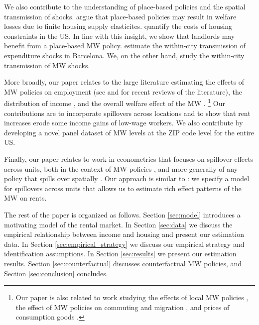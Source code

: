 We also contribute to the understanding of place-based policies and the spatial 
transmission of shocks.
\textcite{KlineMoretti2014} argue that place-based policies may result in 
welfare losses due to finite housing supply elasticites.
\textcite{HsiehMoretti2019} quantify the costs of housing constraints in the US.
In line with this insight, we show that landlords may benefit from a place-based 
MW policy.
\textcite{AllenEtAl2020} estimate the within-city transmission of expenditure 
shocks in Barcelona.
We, on the other hand, study the within-city transmission of MW shocks.

More broadly, our paper relates to the large literature estimating the effects
of MW policies on employment
(see \cite{Dube2019} and \cite{NeumarkShirley2021} for recent reviews of the 
literature), 
the distribution of income \parencite[e.g.,][]{Lee1999, AutorEtAl2016, 
	Dube2019Income}, 
and the overall welfare effect of the MW \parencite{AhlfeldtEtAl2022,
	BergerHerkenhoffMongey2022}.%
\footnote{Our paper is also related to work studying 
	the effects of local MW policies 
	\parencite[e.g.,][]{DubeLindner2021, JardimEtAl2022seattle}, 
	the effect of MW policies on commuting and migration 
	\parencite[e.g.,]{Cadena2014, Monras2019, PerezPerez2021}, 
	and prices of consumption goods 
	\parencite[e.g.,]{AllegrettoReich2018, Leung2021}.}
Our contributions are to incorporate spillovers across locations 
\parencite[as in the recent work by][]{JardimEtAl2022discontinuity} and to show 
that rent increases erode some income gains of low-wage workers.
We also contribute by developing a novel panel dataset of MW levels at the 
ZIP code level for the entire US.

Finally, our paper relates to work in econometrics that focuses on spillover 
effects across units,
both in the context of MW policies 
\parencite{Kuehn2016, JardimEtAl2022discontinuity}, 
and more generally of any policy that spills over spatially
\parencite{DelgadoFlorax2015, Butts2021}.
Our approach is similar to \textcite{GiroudMueller2019}: we specify a model for 
spillovers across units that allows us to estimate rich effect patterns of the 
MW on rents.

The rest of the paper is organized as follows.
Section \ref{sec:model} introduces a motivating model of the rental market.
In Section \ref{sec:data} we discuss the empirical relationship between income 
and housing and present our estimation data.
In Section \ref{sec:empirical_strategy} we discuss our empirical strategy and
identification assumptions.
In Section \ref{sec:results} we present our estimation results.
Section \ref{sec:counterfactual} discusses counterfactual MW policies, and
Section \ref{sec:conclusion} concludes.
